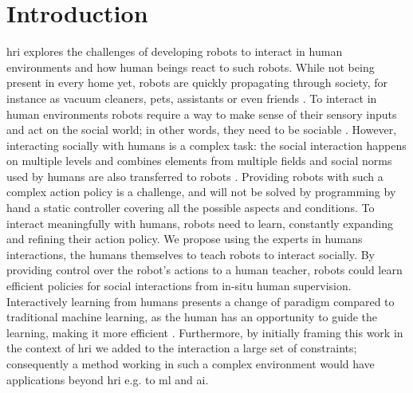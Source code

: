 \chapter{Introduction} \label{chap:intro}
\graphicspath{{images/intro/}}
\glsresetall


\gls{hri} explores the challenges of developing robots to interact in human environments and how human beings react to such robots. While not being present in every home yet, robots are quickly propagating through society, for instance as vacuum cleaners, pets, assistants or even friends \citep{belpaeme2012multimodal}. 
To interact in human environments robots require a way to make sense of their sensory inputs and act on the social world; in other words, they need to be sociable \citep{breazeal2004designing}. However, interacting socially with humans is a complex task: the social interaction happens on multiple levels and combines elements from multiple fields \citep{fong2003survey} and social norms used by humans are also transferred to robots \citep{bartneck2004design}. Providing robots with such a complex action policy is a challenge, and will not be solved by programming by hand a static controller covering all the possible aspects and conditions. To interact meaningfully with humans, robots need to learn, constantly expanding and refining their action policy. We propose using the experts in humans interactions, the humans themselves to teach robots to interact socially. By providing control over the robot's actions to a human teacher, robots could learn efficient policies for social interactions from in-situ human supervision. Interactively learning from humans presents a change of paradigm compared to traditional machine learning, as the human has an opportunity to guide the learning, making it more efficient \citep{fails2003interactive,amershi2014power}. Furthermore, by initially framing this work in the context of \gls{hri} we added to the interaction a large set of constraints; consequently a method working in such a complex environment would have applications beyond \gls{hri} e.g. to \gls{ml} and \gls{ai}.


%
%
%

